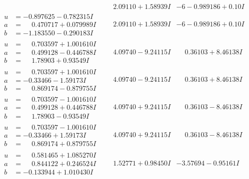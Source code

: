 \documentclass[1p]{elsarticle_modified}
\theoremstyle{definition}
\begin{document}
$$\begin{array}{c|c|c}
 & \phantom{-}2.09110 + 1.58939 I &                  -6
-0.989186 + 0. 10   I\phantom{ +0.000000I} \\ \hline\begin{aligned}
u &= -0.897625 - 0.782315 I \\
a &= \phantom{-}0.470717 + 0.079989 I \\
b &= -1.183550 - 0.290183 I\end{aligned}
 & \phantom{-}2.09110 + 1.58939 I &                  -6
-0.989186 + 0. 10   I\phantom{ +0.000000I} \\ \hline\begin{aligned}
u &= \phantom{-}0.703597 + 1.001610 I \\
a &= \phantom{-}0.499128 - 0.446788 I \\
b &= \phantom{-}1.78903 + 0.93549 I\end{aligned}
 & \phantom{-}4.09740 - 9.24115 I & \phantom{-}0.36103 + 8.46138 I \\ \hline\begin{aligned}
u &= \phantom{-}0.703597 + 1.001610 I \\
a &= -0.33466 - 1.59173 I \\
b &= \phantom{-}0.869174 - 0.879755 I\end{aligned}
 & \phantom{-}4.09740 - 9.24115 I & \phantom{-}0.36103 + 8.46138 I \\ \hline\begin{aligned}
u &= \phantom{-}0.703597 - 1.001610 I \\
a &= \phantom{-}0.499128 + 0.446788 I \\
b &= \phantom{-}1.78903 - 0.93549 I\end{aligned}
 & \phantom{-}4.09740 + 9.24115 I & \phantom{-}0.36103 - 8.46138 I \\ \hline\begin{aligned}
u &= \phantom{-}0.703597 - 1.001610 I \\
a &= -0.33466 + 1.59173 I \\
b &= \phantom{-}0.869174 + 0.879755 I\end{aligned}
 & \phantom{-}4.09740 + 9.24115 I & \phantom{-}0.36103 - 8.46138 I \\ \hline\begin{aligned}
u &= \phantom{-}0.581465 + 1.085270 I \\
a &= \phantom{-}0.844122 + 0.246524 I \\
b &= -0.133944 + 1.010430 I\end{aligned}
 & \phantom{-}1.52771 + 0.98450 I & -3.57694 - 0.95161 I \\ \hline\begin{aligned}

\end{aligned}
\end{array}$$
\end{document}
